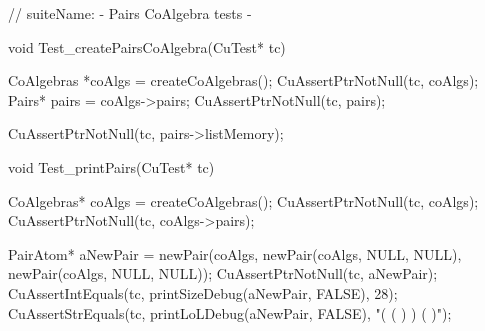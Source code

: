 // suiteName: - Pairs CoAlgebra tests -

void Test_createPairsCoAlgebra(CuTest* tc) {
  CoAlgebras *coAlgs = createCoAlgebras();
  CuAssertPtrNotNull(tc, coAlgs);
  Pairs* pairs = coAlgs->pairs;
  CuAssertPtrNotNull(tc, pairs);

  CuAssertPtrNotNull(tc, pairs->listMemory);
}

void Test_printPairs(CuTest* tc) {
  CoAlgebras* coAlgs = createCoAlgebras();
  CuAssertPtrNotNull(tc, coAlgs);
  CuAssertPtrNotNull(tc, coAlgs->pairs);

  PairAtom* aNewPair = newPair(coAlgs,
                               newPair(coAlgs, NULL, NULL),
                               newPair(coAlgs, NULL, NULL));
  CuAssertPtrNotNull(tc, aNewPair);
  CuAssertIntEquals(tc, printSizeDebug(aNewPair, FALSE), 28);
  CuAssertStrEquals(tc, printLoLDebug(aNewPair, FALSE), "( ( ) ) ( )");
}
\stoptyping
